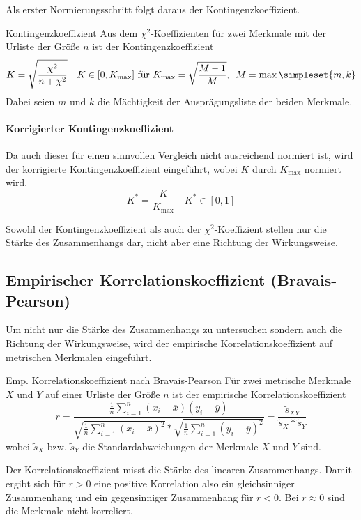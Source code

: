 Als erster Normierungsschritt folgt daraus der Kontingenzkoeffizient.
\begin{definition}{Kontingenzkoeffizient}
	Aus dem $\chi^2$-Koeffizienten für zwei Merkmale mit der Urliste der Größe $n$ ist der Kontingenzkoeffizient
	\begin{equation*}
		K=\sqrt{\frac{\chi^2}{n+\chi^2}} \quad K\in[0, K_{\mathrm{max}}] \text{ für } K_{\mathrm{max}}=\sqrt{\frac{M-1}{M}},\enspace M=\max\simpleset{m,k}
	\end{equation*}
	Dabei seien $m$ und $k$ die Mächtigkeit der Ausprägungsliste der beiden Merkmale.
\end{definition}

\paragraph{Korrigierter Kontingenzkoeffizient}
Da auch dieser für einen sinnvollen Vergleich nicht ausreichend normiert ist, wird der korrigierte Kontingenzkoeffizient eingeführt, wobei $K$ durch $K_{\mathrm{max}}$ normiert wird.
\begin{equation*}
	K^\ast = \frac{K}{K_{\mathrm{max}}}\quad K^\ast \in [0,1]
\end{equation*}

Sowohl der Kontingenzkoeffizient als auch der $\chi^2$-Koeffizient stellen nur die Stärke des Zusammenhangs dar, nicht aber eine Richtung der Wirkungsweise. 

\subsection{Empirischer Korrelationskoeffizient (Bravais-Pearson)}
Um nicht nur die Stärke des Zusammenhangs zu untersuchen sondern auch die Richtung der Wirkungsweise, wird der empirische Korrelationskoeffizient auf metrischen Merkmalen eingeführt.
\begin{definition}{Emp. Korrelationskoeffizient nach Bravais-Pearson}
	Für zwei metrische Merkmale $X$ und $Y$ auf einer Urliste der Größe $n$ ist der empirische Korrelationskoeffizient
	\begin{equation*}
		r=\frac{\frac1n\sum\limits_{i=1}^n (x_i-\overline x)(y_i-\overline y)}{\sqrt{\frac1n\sum\limits_{i=1}^n (x_i-\overline x)^2} * \sqrt{\frac1n\sum\limits_{i=1}^n (y_i-\overline y)^2}}=\frac{\tilde s_{XY}}{\tilde s_X*\tilde s_Y}
	\end{equation*}
	wobei $\tilde s_X$ bzw. $\tilde s_Y$ die Standardabweichungen der Merkmale $X$ und $Y$ sind.
\end{definition}
Der Korrelationskoeffizient misst die Stärke des linearen Zusammenhangs.
Damit ergibt sich für $r>0$ eine positive Korrelation also ein gleichsinniger Zusammenhang und ein gegensinniger Zusammenhang für $r<0$. Bei $r\approx0$ sind die Merkmale nicht korreliert.

